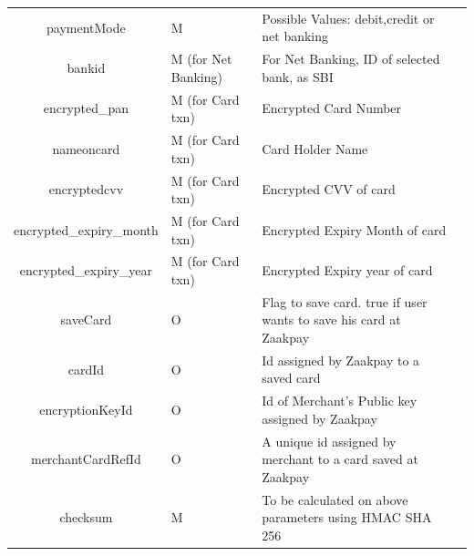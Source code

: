 \documentclass{article}
\begin{document}
\begin{longtable}{||c|| p{2.09cm}|| p{5.5cm}| p{4.7cm}||}
paymentMode  & M & Possible Values: debit,credit or net banking &  \\
bankid & M (for Net Banking) & For Net Banking, ID of selected bank, as SBI & \\
encrypted\_pan & M (for Card txn) & Encrypted Card Number &  \\
nameoncard & M (for Card txn) & Card Holder Name & \\
encryptedcvv & M (for Card txn) & Encrypted CVV of card & \\
encrypted\_expiry\_month & M (for Card txn) & Encrypted Expiry Month of card & \\
encrypted\_expiry\_year & M (for Card txn) & Encrypted Expiry year of card & \\
saveCard & O & Flag to save card.  true if user wants to save his card at Zaakpay & \\
cardId & O & Id assigned by Zaakpay to a saved card & \\
encryptionKeyId & O & Id of Merchant’s Public key assigned by Zaakpay & \\
merchantCardRefId & O & A unique id assigned by merchant to a card saved at Zaakpay & \\
checksum & M & To be calculated on above parameters using HMAC SHA 256 & \\
\end{longtable}
\end{document}
